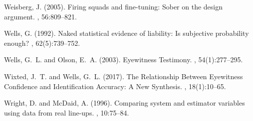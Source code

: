 \documentclass{article}
\begin{document}
\begin{thebibliography}{}
Weisberg, J. (2005).
\newblock Firing squads and fine-tuning: Sober on the design argument.
, 56:809--821.

Wells, G. (1992).
\newblock Naked statistical evidence of liability: Is subjective probability
  enough?
, 62(5):739--752.

Wells, G.~L. and Olson, E.~A. (2003).
\newblock Eyewitness {{Testimony}}.
, 54(1):277--295.

Wixted, J.~T. and Wells, G.~L. (2017).
\newblock The {{Relationship Between Eyewitness Confidence}} and
  {{Identification Accuracy}}: {{A New Synthesis}}.
, 18(1):10--65.

Wright, D. and McDaid, A. (1996).
\newblock Comparing system and estimator variables using data from real
  line-ups.
, 10:75--84.

\end{thebibliography}
\end{document}
